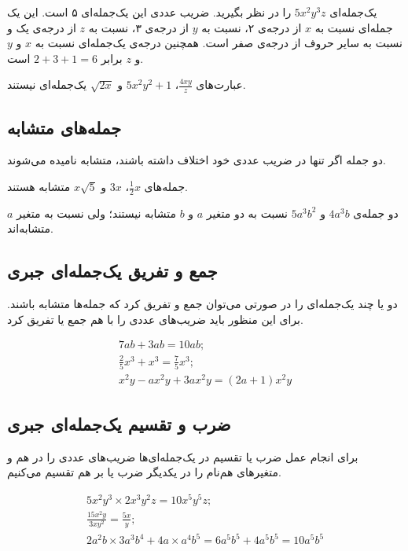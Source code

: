 \begin{example}
	یک‌جمله‌ای $5x^2y^3z$ را در نظر بگیرید. ضریب عددی این یک‌جمله‌ای ۵ است. این یک جمله‌ای نسبت به $x$ از درجه‌ی ۲، نسبت به $y$ از درجه‌ی ۳، نسبت به $z$ از درجه‌ی یک و نسبت به سایر حروف از درجه‌ی صفر است. همچنین درجه‌ی یک‌جمله‌ای نسبت به $x$ و $y$ و $z$ برابر $2+3+1=6$ است.
\end{example}

\begin{example}
	عبارت‌های
	$\frac{4xy}{z}$، $5x^2y^2+1$ و $\sqrt{2x}$
	یک‌جمله‌ای نیستند.
\end{example}

\subsection{جمله‌های متشابه}
دو جمله اگر تنها در ضریب عددی خود اختلاف داشته باشند، متشابه نامیده می‌شوند.
\begin{example}
	جمله‌های
	$\frac{1}{2}x$، $3x$ و $x\sqrt{5}$
	متشابه هستند.
\end{example}

\begin{example}
	دو جمله‌ی
	$4a^3b$
	و $5a^3b^2$
	نسبت به دو متغیر $a$ و $b$ متشابه نیستند؛ ولی نسبت به متغیر $a$ متشابه‌اند.
\end{example}

\subsection{جمع و تفریق یک‌جمله‌ای جبری}
دو یا چند یک‌جمله‌ای را در صورتی می‌توان جمع و تفریق کرد که جمله‌ها متشابه باشند. برای این منظور باید ضریب‌های عددی را با هم جمع یا تفریق کرد.
\begin{example}
	\begin{gather*}
		7ab + 3ab = 10ab ; \\
		\frac{2}{5}x^3 + x^3 = \frac{7}{5}x^3 ; \\
		x^2y - ax^2y + 3ax^2y = (2a+1)x^2y
	\end{gather*}
\end{example}

\subsection{ضرب و تقسیم یک‌جمله‌ای جبری}
برای انجام عمل ضرب یا تقسیم در یک‌جمله‌ای‌ها ضریب‌های عددی را در هم و متغیرهای هم‌نام را در یکدیگر ضرب یا بر هم تقسیم می‌کنیم.
\begin{example}
	\begin{gather*}
		5x^2y^3 \times 2x^3y^2z = 10x^5y^5z ; \\
		\frac{15x^2y}{3xy^2} = \frac{5x}{y} ; \\
		2a^2b \times 3a^3b^4 + 4a \times a^4b^5 = 6a^5b^5 + 4a^5b^5 = 10a^5b^5
	\end{gather*}
\end{example}

